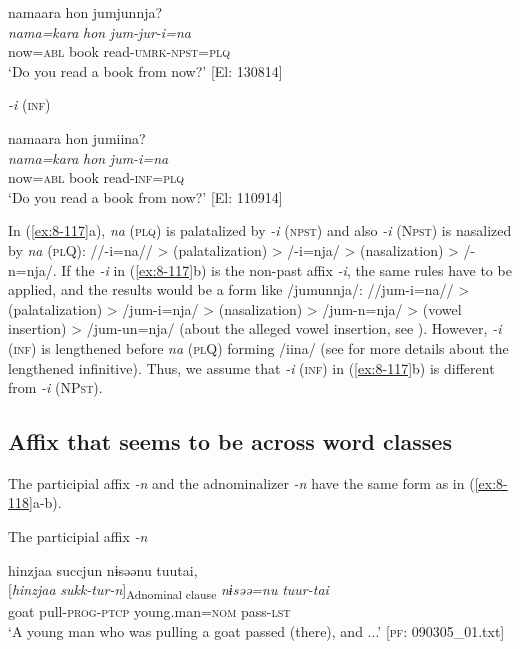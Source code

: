{\TM}
\glll  namaara  hon  jumjunnja?\\
\textit{nama=kara}  \textit{hon}  \textit{jum-jur-i=na}\\
now=\textsc{abl}  book  read-\textsc{umrk}-\textsc{npst}=\textsc{plq}\\
\glt ‘Do you read a book from now?’ [El: 130814]


\ex \textit{-i} (\textsc{inf})

{\TM}
\glll  namaara  hon  jumiina?\\
\textit{nama=kara}  \textit{hon}  \textit{jum-i=na}\\
now=\textsc{abl}  book  read-\textsc{inf}=\textsc{plq}\\
\glt ‘Do you read a book from now?’ [El: 110914]
\z
\z

In (\ref{ex:8-117}a), \textit{na} (\textsc{plq}) is palatalized by \textit{-i} (\textsc{npst}) and also \textit{-i} (N\textsc{pst}) is nasalized by \textit{na} (\textsc{pl}Q): //-i=na// > (palatalization) > /-i=nja/ > (nasalization) > /-n=nja/. If the \textit{-i} in (\ref{ex:8-117}b) is the non-past affix \textit{-i}, the same rules have to be applied, and the results would be a form like /jumunnja/: //jum-i=na// > (palatalization) > /jum-i=nja/ > (nasalization) > /jum-n=nja/ > (vowel insertion) > /jum-un=nja/ (about the alleged vowel insertion, see ). However, \textit{-i} (\textsc{inf}) is lengthened before \textit{na} (\textsc{pl}Q) forming /iina/ (see  for more details about the lengthened infinitive). Thus, we assume that \textit{-i} (\textsc{inf}) in (\ref{ex:8-117}b) is different from \textit{-i} (NP\textsc{st}).

\subsection{Affix that seems to be across word classes}

The participial affix \textit{-n} and the adnominalizer \textit{-n} have the same form as in (\ref{ex:8-118}a-b).

\ea\label{ex:8-118}
\ea The participial affix \textit{-n}

  {\TM}
\glll   hinzjaa  succjun  nɨsəənu  tuutai,\\
    {}[\textit{hinzjaa}  \textit{sukk-tur-n}]\textsubscript{Adnominal clause}  \textit{nɨsəə=nu}  \textit{tuur-tai}\\
    goat  pull-\textsc{prog}-\textsc{ptcp}  young.man=\textsc{nom}  pass-\textsc{lst}\\
\glt ‘A young man who was pulling a goat passed (there), and ...’  [\textsc{pf}: 090305\_01.txt]

